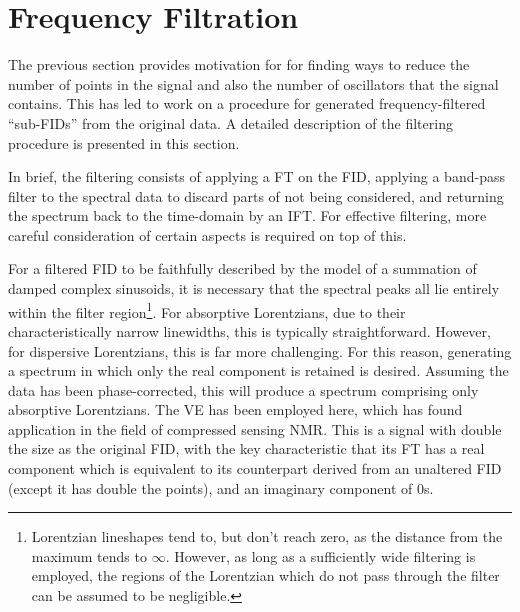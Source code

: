 \section{Frequency Filtration}
\label{sec:filtering}
The previous section provides motivation for for finding ways to reduce the
number of points in the signal and also the number of oscillators that the
signal contains. This has led to work on a procedure for generated
frequency-filtered ``sub-FIDs'' from the original data. A detailed description
of the filtering procedure is presented in this section.

In brief, the filtering consists of applying a \ac{FT} on the \ac{FID},
applying a band-pass filter to the spectral data to discard parts of not being
considered, and returning the spectrum back to the time-domain by an \ac{IFT}.
For effective filtering, more careful consideration of certain aspects is
required on top of this.

For a filtered \ac{FID} to be faithfully described by the model of a
summation of damped complex sinusoids, it is necessary that the
spectral peaks all lie entirely within the filter region\footnote{
    Lorentzian lineshapes tend to, but don't reach zero, as the distance from
    the maximum tends to $\infty$\cite{Tang1994}. However, as long as a
    sufficiently wide filtering is employed, the regions of the Lorentzian
    which do not pass through the filter can be assumed to be negligible.
}.
For absorptive Lorentzians, due to their characteristically narrow
linewidths, this is typically straightforward. However, for dispersive
Lorentzians, this is far more challenging. For this reason, generating
a spectrum in which only the real component is retained is desired.
Assuming the data has been phase-corrected, this will produce a
spectrum comprising only absorptive Lorentzians. The \ac{VE} has been employed
here, which has found application in the field of compressed sensing
NMR\cite{Mayzel2014,Golowicz2020,Luo2020}. This is a signal with double the
size as the original \ac{FID}, with the key characteristic that its \ac{FT} has
a real component which is equivalent to its counterpart derived from an
unaltered \ac{FID} (except it has double the points), and an imaginary
component of $0$s.

